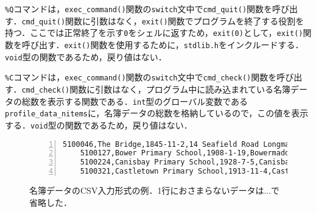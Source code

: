 \verb|%Q|コマンドは，\verb|exec_command()|関数の\verb|switch|文中で\verb|cmd_quit()|関数を呼び出す．\verb|cmd_quit()|関数に引数はなく，\verb|exit()|関数でプログラムを終了する役割を持つ．ここでは正常終了を示す\verb|0|をシェルに返すため，\verb|exit(0)|として，\verb|exit()|関数を呼び出す．\verb|exit()|関数を使用するために，\verb|stdlib.h|をインクルードする．\verb|void|型の関数であるため，戻り値はない．

\verb|%C|コマンドは，\verb|exec_command()|関数の\verb|switch|文中で\verb|cmd_check()|関数を呼び出す．\verb|cmd_check()|関数に引数はなく，プログラム中に読み込まれている名簿データの総数を表示する関数である．\verb|int|型のグローバル変数である\verb|profile_data_nitems|に，名簿データの総数を格納しているので，この値を表示する．\verb|void|型の関数であるため，戻り値はない．


\begin{figure}[b]
\centering %
\begin{Verbatim}[frame=single, xleftmargin=5mm, xrightmargin=5mm, gobble=4,
                 fontsize=\small, numbers=left, firstnumber=1]
    5100046,The Bridge,1845-11-2,14 Seafield Road Longman Inverness,SEN Unit 2.0 Open
    5100127,Bower Primary School,1908-1-19,Bowermadden Bower Caithness,01955 641225 ...
    5100224,Canisbay Primary School,1928-7-5,Canisbay Wick,01955 611337 Primary 56 3...
    5100321,Castletown Primary School,1913-11-4,Castletown Thurso,01847 821256 01847...
\end{Verbatim}
    \caption{名簿データのCSV入力形式の例．1行におさまらないデータは...で省略した．}
    \label{fig:csvdata}
\end{figure}

